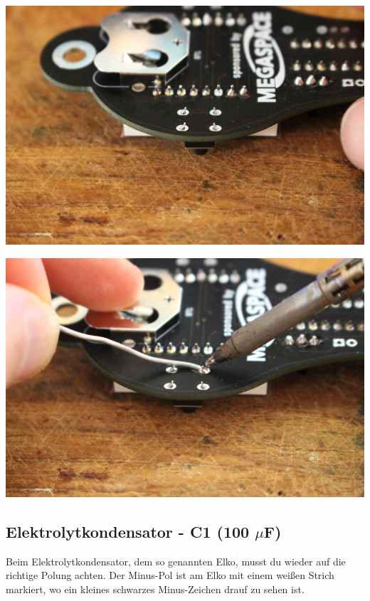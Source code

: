 \documentclass{article}
\begin{document}
\begin{minipage}[b]{0.5\textwidth}
	\includegraphics[width=\textwidth]{Bilder2022/IMG_8233.JPG}
\end{minipage}
\begin{minipage}[b]{0.5\textwidth}
	\includegraphics[width=\textwidth]{Bilder2022/IMG_8234.JPG}
\end{minipage}

\subsection{Elektrolytkondensator - C1 (100 $\mu$F)}

Beim Elektrolytkondensator, dem so genannten Elko, musst du wieder auf die richtige Polung achten. Der Minus-Pol ist am Elko mit einem weißen Strich markiert, wo ein kleines schwarzes Minus-Zeichen drauf zu sehen ist.\\
\end{document}
